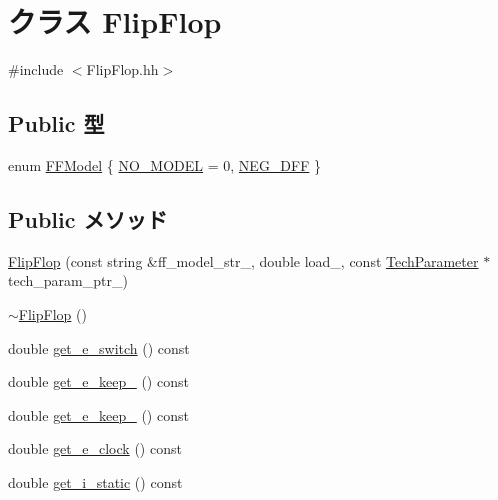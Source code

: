 \hypertarget{classFlipFlop}{
\section{クラス FlipFlop}
\label{classFlipFlop}
}


{\ttfamily \#include $<$FlipFlop.hh$>$}\subsection*{Public 型}
\begin{DoxyCompactItemize}
\item 
enum \hyperlink{classFlipFlop_a56818e5d3e33fce7656b2034c4456fa1}{FFModel} \{ \hyperlink{classFlipFlop_a56818e5d3e33fce7656b2034c4456fa1abab57b6e2c553e4d983f415a1f4ea75b}{NO\_\-MODEL} =  0, 
\hyperlink{classFlipFlop_a56818e5d3e33fce7656b2034c4456fa1ae18ef7a41f68a232ba011de6233358a9}{NEG\_\-DFF}
 \}
\end{DoxyCompactItemize}
\subsection*{Public メソッド}
\begin{DoxyCompactItemize}
\item 
\hyperlink{classFlipFlop_ad1873b93cdb4d5cfa25037d8882855ed}{FlipFlop} (const string \&ff\_\-model\_\-str\_\-, double load\_\-, const \hyperlink{classTechParameter}{TechParameter} $\ast$tech\_\-param\_\-ptr\_\-)
\item 
\hyperlink{classFlipFlop_a5ad30637ad1ea867d4d0de77a909301a}{$\sim$FlipFlop} ()
\item 
double \hyperlink{classFlipFlop_a9872d2437aa4caa945007936b10becb1}{get\_\-e\_\-switch} () const 
\item 
double \hyperlink{classFlipFlop_a4c1b6018bc8cfbbb59802749c25d2fc7}{get\_\-e\_\-keep\_} () const 
\item 
double \hyperlink{classFlipFlop_ac83321c56f433dfeeae891310348b961}{get\_\-e\_\-keep\_} () const 
\item 
double \hyperlink{classFlipFlop_ab95f28822addf0d46785fbab52bf6d32}{get\_\-e\_\-clock} () const 
\item 
double \hyperlink{classFlipFlop_af4ce13e52cccc034f4f0bb0f0a6c9468}{get\_\-i\_\-static} () const 
\end{DoxyCompactItemize}

